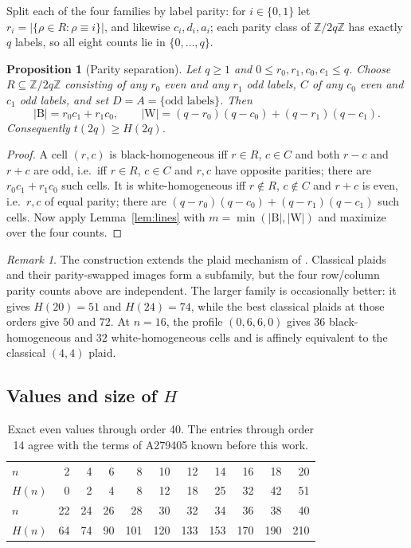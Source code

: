 \documentclass[11pt]{amsart}
\newtheorem{proposition}[theorem]{Proposition}
\theoremstyle{definition}
\theoremstyle{remark}
\newtheorem{remark}[theorem]{Remark}
\newcommand{\Z}{\mathbb{Z}}
\newcommand{\Bl}{\mathrm{B}}
\newcommand{\Wh}{\mathrm{W}}
\begin{document}
Split each of the four families by label parity: for $i\in\{0,1\}$ let $r_i=|\{\rho\in R:\rho\equiv i\}|$, and likewise $c_i,d_i,a_i$; each parity class of $\Z/2q\Z$ has exactly $q$ labels, so all eight counts lie in $\{0,\dots,q\}$.

\begin{proposition}[Parity separation]\label{prop:lower}
Let $q\ge1$ and $0\le r_0,r_1,c_0,c_1\le q$. Choose $R\subseteq\Z/2q\Z$ consisting of any $r_0$ even and any $r_1$ odd labels, $C$ of any $c_0$ even and $c_1$ odd labels, and set $D=A=\{\text{odd labels}\}$. Then
\[
|\Bl|=r_0c_1+r_1c_0,
\qquad
|\Wh|=(q-r_0)(q-c_0)+(q-r_1)(q-c_1).
\]
Consequently $t(2q)\ge H(2q)$.
\end{proposition}

\begin{proof}
A cell $(r,c)$ is black-homogeneous iff $r\in R$, $c\in C$ and both $r-c$ and $r+c$ are odd, i.e.\ iff $r\in R$, $c\in C$ and $r,c$ have opposite parities; there are $r_0c_1+r_1c_0$ such cells. It is white-homogeneous iff $r\notin R$, $c\notin C$ and $r+c$ is even, i.e.\ $r,c$ of equal parity; there are $(q-r_0)(q-c_0)+(q-r_1)(q-c_1)$ such cells. Now apply Lemma~\ref{lem:lines} with $m=\min(|\Bl|,|\Wh|)$ and maximize over the four counts.
\end{proof}

\begin{remark}\label{rem:plaid16}
The construction extends the plaid mechanism of \cite[\S3]{CDHS24}.
Classical plaids and their parity-swapped images form a subfamily, but the
four row/column parity counts above are independent.  The larger family is
occasionally better: it gives $H(20)=51$ and $H(24)=74$, while the best
classical plaids at those orders give $50$ and $72$.  At $n=16$, the profile
$(0,6,6,0)$ gives $36$ black-homogeneous and $32$ white-homogeneous cells
and is affinely equivalent to the classical $(4,4)$ plaid.
\end{remark}

\subsection{Values and size of \texorpdfstring{$H$}{H}}

\begin{table}[ht]
\centering\small
\begin{tabular}{@{}l*{10}{r}@{}}
\toprule
$n$      & 2 & 4 & 6 & 8 & 10 & 12 & 14 & 16 & 18 & 20\\
$H(n)$   & 0 & 2 & 4 & 8 & 12 & 18 & 25 & 32 & 42 & 51\\
\midrule
$n$      & 22 & 24 & 26 & 28 & 30 & 32 & 34 & 36 & 38 & 40\\
$H(n)$   & 64 & 74 & 90 & 101 & 120 & 133 & 153 & 170 & 190 & 210\\
\bottomrule
\end{tabular}
\medskip
\caption{Exact even values through order 40.  The entries through order 14
agree with the terms of A279405 known before this work.}\label{tab:Hvals}
\end{table}
\end{document}

